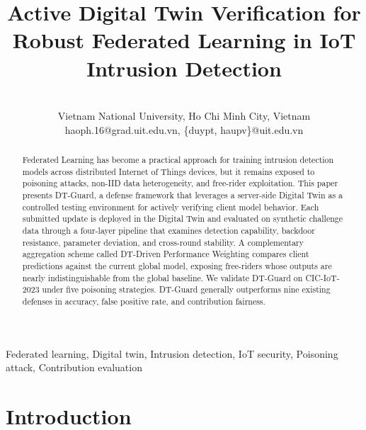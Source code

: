 \documentclass[conference]{IEEEtran}
\begin{document}
\title{Active Digital Twin Verification for Robust Federated Learning in IoT Intrusion Detection}

\author{
\\
Vietnam National University, Ho Chi Minh City, Vietnam\\

haoph.16@grad.uit.edu.vn, \{duypt, haupv\}@uit.edu.vn}


\maketitle

\begin{abstract}
Federated Learning has become a practical approach for training intrusion detection models across distributed Internet of Things devices, but it remains exposed to poisoning attacks, non-IID data heterogeneity, and free-rider exploitation. This paper presents DT-Guard, a defense framework that leverages a server-side Digital Twin as a controlled testing environment for actively verifying client model behavior. Each submitted update is deployed in the Digital Twin and evaluated on synthetic challenge data through a four-layer pipeline that examines detection capability, backdoor resistance, parameter deviation, and cross-round stability. A complementary aggregation scheme called DT-Driven Performance Weighting compares client predictions against the current global model, exposing free-riders whose outputs are nearly indistinguishable from the global baseline. We validate DT-Guard on CIC-IoT-2023 under five poisoning strategies. DT-Guard generally outperforms nine existing defenses in accuracy, false positive rate, and contribution fairness.
\end{abstract}

\begin{IEEEkeywords}
Federated learning, Digital twin, Intrusion detection, IoT security, Poisoning attack, Contribution evaluation
\end{IEEEkeywords}

\section{Introduction}
\end{document}
